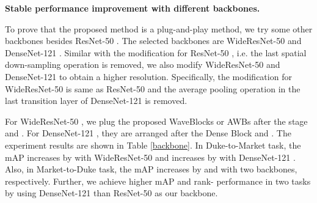 \documentclass[journal]{IEEEtran}
\begin{document}
\textbf{Stable performance improvement with different backbones.}\par 
To prove that the proposed method is a plug-and-play method, we try some other backbones besides ResNet-50 \cite{he2016deep}. The selected backbones are WideResNet-50 \cite{zagoruyko2016wide} and DenseNet-121 \cite{huang2017densely}. Similar with the modification for ResNet-50 \cite{he2016deep}, i.e. the last spatial down-sampling operation is removed, we also modify  WideResNet-50 \cite{zagoruyko2016wide} and DenseNet-121 \cite{huang2017densely} to obtain a higher resolution. Specifically, the modification for WideResNet-50 \cite{zagoruyko2016wide} is same as ResNet-50 \cite{he2016deep} and the average pooling operation in the last transition layer of DenseNet-121 \cite{huang2017densely} is removed. \par 
For WideResNet-50 \cite{zagoruyko2016wide}, we plug the proposed WaveBlocks or AWBs after the stage  and . For DenseNet-121 \cite{huang2017densely}, they are arranged after the Dense Block  and . The experiment results are shown in Table \ref{backbone}. In Duke-to-Market task, the mAP increases by  with WideResNet-50 \cite{zagoruyko2016wide} and increases by  with DenseNet-121 \cite{huang2017densely}. Also, in Market-to-Duke task, the mAP increases by  and  with two backbones, respectively. Further, we achieve higher mAP and rank- performance in two tasks by using DenseNet-121 \cite{huang2017densely} than ResNet-50 \cite{huang2017densely} as our backbone.
\end{document}
